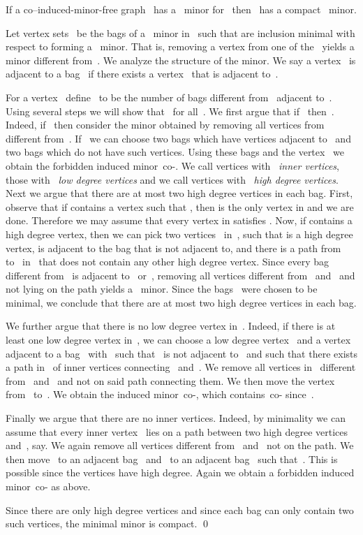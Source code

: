 \documentclass[envcountsame,envcountsect,11pt,a4paper]{llncs}
\renewenvironment{proof}{\begin{Proof}}{\qed\end{Proof}}
\begin{document}
\begin{lemma}\label{thm:existence:of:compact:minors}
If a co--induced-minor-free graph~ has a~ minor for~ then~ has a compact~ minor.
\end{lemma}

\begin{proof}
Let vertex sets~ be the bags of a~ minor in~ such that  are inclusion minimal with respect to forming a~ minor. That is, removing a vertex from one of the~ yields a minor different from~.
We analyze the structure of the minor. We say a vertex~ is adjacent to a bag~ if there exists a vertex~ that is adjacent to~.

For a vertex~ define~ to be the number of bags different from~ adjacent to~.
Using several steps we will show that~ for all~.
We first argue that if~ then~.
Indeed, if~ then consider the minor obtained by removing all vertices from~ different from~. If~ we can
choose two bags which have vertices adjacent to~ and two bags which do not have such vertices. Using these bags and the vertex~ we
obtain the forbidden induced minor~co-.
We call vertices with~ \emph{inner vertices}, those with~ \emph{low degree vertices} and we call vertices with~ \emph{high degree vertices}.
Next we argue that there are at most two high degree vertices in each bag.
First, observe that if  contains a vertex  such that , then  is the only vertex in  and we are done. Therefore
we may assume that every vertex  in  satisfies .
Now, if  contains a high degree vertex, then we can pick two vertices~ in~,
such that  is a high degree vertex,  is adjacent to the bag that  is not adjacent to, and there
is a path from~ to~ in~ that does not contain any other high degree vertex.
Since every bag different from~ is adjacent to~ or~, removing all vertices different from~ and~ and not lying on the path
yields a~ minor. Since the bags~ were chosen to be minimal, we conclude that there are at most two high degree vertices
in each bag.
 
We further argue that there is no low degree vertex in~.
Indeed, if there is at least one low degree vertex in~, we can choose a low degree vertex~ and a vertex~
adjacent to a bag~ with~ such that~ is not adjacent to~ and such that there exists a path in~ of inner vertices
connecting~ and~. We remove all vertices in~ different from~ and~ and not on said path connecting them. We then move the
vertex~ from~ to~. We obtain the induced minor~co-, which contains~co-
since~.

Finally we argue that there are no inner vertices. Indeed, by minimality we can assume that every inner vertex~ lies on a path between two high degree vertices~ and~, say. We again remove all vertices different from~ and~ not on the path. We then move~ to an adjacent bag~ and~ to an adjacent bag~ such that~. This is possible since the vertices have high degree. Again we obtain a forbidden induced minor~co- as above.

Since there are only high degree vertices and since each bag can only contain two such vertices, the minimal minor is compact.
\end{proof}
\end{document}
